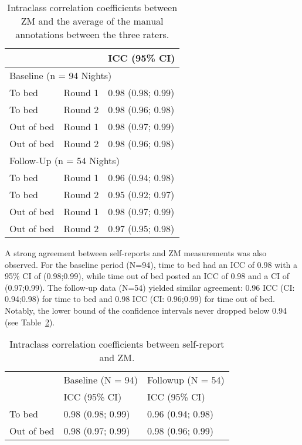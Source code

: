 \documentclass[
  10pt,
]{scrbook}
\begin{document}
\pagebreak

\begingroup

\footnotesize

\hypertarget{tbl-man_icc_zm_man}{}
\begin{longtable}{lll}
\caption{\label{tbl-man_icc_zm_man}Intraclass correlation coefficients between ZM and the average of the
manual annotations between the three raters. }\tabularnewline

\toprule
 &  & ICC (95\% CI) \\ 
\midrule
\multicolumn{3}{l}{Baseline (n = 94 Nights)} \\ 
\midrule
To bed & Round 1 & 0.98 (0.98; 0.99) \\ 
To bed & Round 2 & 0.98 (0.96; 0.98) \\ 
Out of bed & Round 1 & 0.98 (0.97; 0.99) \\ 
Out of bed & Round 2 & 0.98 (0.96; 0.98) \\ 
\midrule
\multicolumn{3}{l}{Follow-Up (n = 54 Nights)} \\ 
\midrule
To bed & Round 1 & 0.96 (0.94; 0.98) \\ 
To bed & Round 2 & 0.95 (0.92; 0.97) \\ 
Out of bed & Round 1 & 0.98 (0.97; 0.99) \\ 
Out of bed & Round 2 & 0.97 (0.95; 0.98) \\ 
\bottomrule
\end{longtable}

\endgroup

A strong agreement between self-reports and ZM measurements was also
observed. For the baseline period (N=94), time to bed had an ICC of 0.98
with a 95\% CI of (0.98;0.99), while time out of bed posted an ICC of
0.98 and a CI of (0.97;0.99). The follow-up data (N=54) yielded similar
agreement: 0.96 ICC (CI: 0.94;0.98) for time to bed and 0.98 ICC (CI:
0.96;0.99) for time out of bed. Notably, the lower bound of the
confidence intervals never dropped below 0.94 (see
Table~\ref{tbl-man_icc_zm_self}).

\begingroup

\footnotesize

\hypertarget{tbl-man_icc_zm_self}{}
\begin{longtable}{lll}
\caption{\label{tbl-man_icc_zm_self}Intraclass correlation coefficients between self-report and ZM. }\tabularnewline

\toprule
 & Baseline (N = 94) & Followup (N = 54) \\ 
\cmidrule(lr){2-2} \cmidrule(lr){3-3}
 & ICC (95\% CI) &  ICC (95\% CI) \\ 
\midrule
To bed & 0.98 (0.98; 0.99) & 0.96 (0.94; 0.98) \\ 
Out of bed & 0.98 (0.97; 0.99) & 0.98 (0.96; 0.99) \\ 
\bottomrule
\end{longtable}
\end{document}
